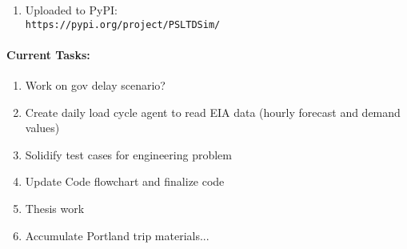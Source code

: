 \documentclass[12pt]{article}
\begin{document}
\begin{multicols}{2}
\begin{enumerate}
\item Uploaded to PyPI:\\
\verb|https://pypi.org/project/PSLTDSim/|

\vfill\null
\columnbreak
	
	\end{enumerate}
\paragraph{Current Tasks:}
	\begin{enumerate}
		\itemsep0em 
		\item Work on gov delay scenario?
\item Create daily load cycle agent to read EIA data (hourly forecast and demand values)
		\item Solidify test cases for engineering problem
		\item Update Code flowchart and finalize code%
		\item Thesis work 
		\item Accumulate Portland trip materials...
\end{enumerate}

\begin{comment}

\paragraph{Proposed MiniWECC test cases:} \ \\
duration: 4-6 hours
\begin{itemize}
	\itemsep0em 
\item system noise 
\item wind generation ramps 
\item daily load cycle (during peak/valley transition)
\end{itemize}

Control varaitions:\\
Normal gov deadband and large gov deadband \\
Fast (seconds) and slow (minutes) AGC
\\ Three cases: 
\begin{itemize}
	\itemsep0em 
\item normal gov, Slow AGC
\item normal gov, Fast AGC
\item large gov, Fast AGC
\end{itemize}

Experimental Measures:
\begin{itemize}
\itemsep 0em
\item Valve movement
\item NERC mandate adherence
\end{itemize}
\end{comment}



\end{multicols}
\end{document}
